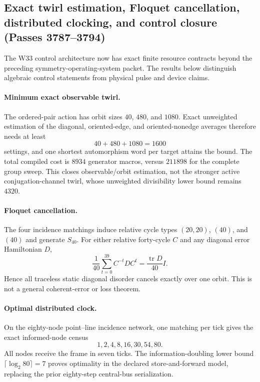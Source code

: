 \subsection{Exact twirl estimation, Floquet cancellation, distributed clocking, and control closure (Passes 3787--3794)}
\label{sec:bt3787-3794}

The W33 control architecture now has exact finite resource contracts beyond the preceding symmetry-operating-system packet.  The results below distinguish algebraic control statements from physical pulse and device claims.

\paragraph{Minimum exact observable twirl.}
The ordered-pair action has orbit sizes $40$, $480$, and $1080$.  Exact unweighted estimation of the diagonal, oriented-edge, and oriented-nonedge averages therefore needs at least
\[
40+480+1080=1600
\]
settings, and one shortest automorphism word per target attains the bound.  The total compiled cost is $8934$ generator macros, versus $211898$ for the complete group sweep.  This closes observable/orbit estimation, not the stronger active conjugation-channel twirl, whose unweighted divisibility lower bound remains $4320$.

\paragraph{Floquet cancellation.}
The four incidence matchings induce relative cycle types $(20,20)$, $(40)$, and $(40)$ and generate $S_{40}$.  For either relative forty-cycle $C$ and any diagonal error Hamiltonian $D$,
\[
\frac1{40}\sum_{t=0}^{39}C^{-t}DC^t
=\frac{\operatorname{tr}D}{40}I.
\]
Hence all traceless static diagonal disorder cancels exactly over one orbit.  This is not a general coherent-error or loss theorem.

\paragraph{Optimal distributed clock.}
On the eighty-node point--line incidence network, one matching per tick gives the exact informed-node census
\[
1,2,4,8,16,30,54,80.
\]
All nodes receive the frame in seven ticks.  The information-doubling lower bound $\lceil\log_2 80\rceil=7$ proves optimality in the declared store-and-forward model, replacing the prior eighty-step central-bus serialization.

